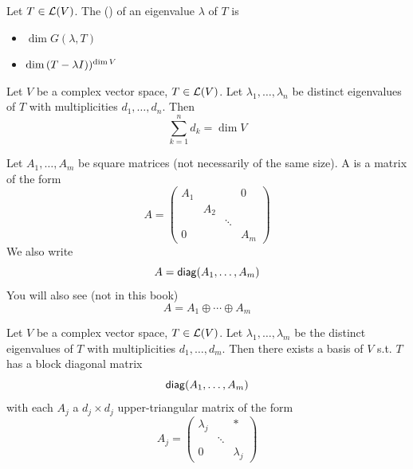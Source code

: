 \documentclass[aspectratio=169]{beamer}
\begin{document}
\begin{frame}
\begin{definition}
Let $T\in\mathcal{L}(V)$. The ()  of an eigenvalue $\lambda$ of $T$ is 
\begin{itemize}
\item $\dim G(\lambda,T)$
\item $\dim\null(T-\lambda I))^{\dim V}$
\end{itemize}
\end{definition}

\begin{theorem}[$\sum$ multiplicities $=\dim V$]
Let $V$ be a complex vector space, $T\in\mathcal{L}(V)$. Let $\lambda_1,\ldots,\lambda_n$ be distinct eigenvalues of $T$ with multiplicities $d_1,\ldots,d_n$. Then
\[
\sum_{k=1}^{n}d_k = \dim V 
\]
\end{theorem}
\end{frame}


\begin{frame}
\begin{definition}
Let $A_1,\ldots,A_m$ be square matrices (not necessarily of the same size). A  is a matrix of the form
\[
A=\begin{pmatrix}
A_1 & & & 0 \\
& A_2 & & \\
& & \ddots  & \\
0 & & & A_m
\end{pmatrix}
\]
We also write
\[
A=\mathsf{diag}(A_1,\ldots,A_m)
\]
You will also see (not in this book)
\[
A=A_1\oplus\cdots\oplus A_m
\]
\end{definition}
\end{frame}

\begin{frame}
\begin{importanttheorem}
Let $V$ be a complex vector space, $T\in\mathcal{L}(V)$. Let $\lambda_1,\ldots,\lambda_m$ be the distinct eigenvalues of $T$ with multiplicities $d_1,\ldots,d_m$. Then there exists a basis of $V$ s.t. $T$ has a block diagonal matrix
\[
\mathsf{diag}(A_1,\ldots,A_m)
\]
with each $A_j$ a $d_j\times d_j$ upper-triangular matrix of the form
\[
A_j=\begin{pmatrix}
\lambda_j & & * \\ & \ddots & \\ 0 & & \lambda_j
\end{pmatrix}
\]
\end{importanttheorem}
\end{frame}
\end{document}
